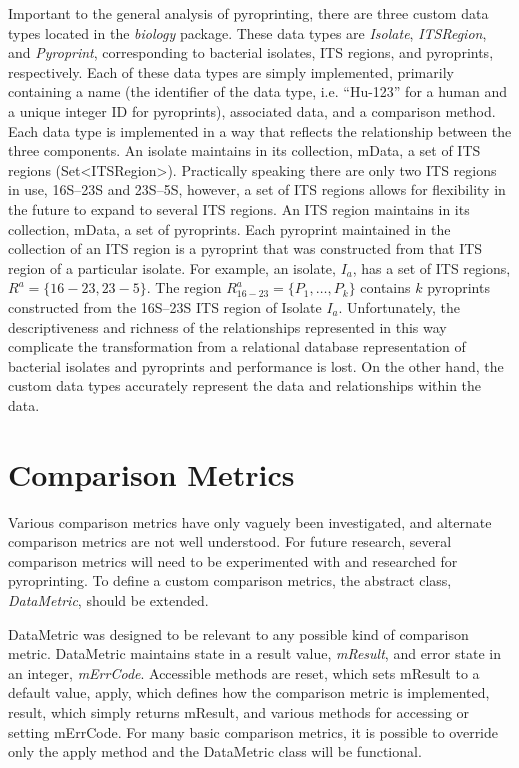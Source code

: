 \documentclass[12pt]{ucthesis}
\begin{document}
      Important to the general analysis of pyroprinting, there are three custom
      data types located in the \textit{biology} package. These data types are
      \textit{Isolate}, \textit{ITSRegion}, and \textit{Pyroprint},
      corresponding to bacterial isolates, ITS regions, and pyroprints,
      respectively. Each of these data types are simply implemented, primarily
      containing a name (the identifier of the data type, i.e. ``Hu-123'' for a
      human and a unique integer ID for pyroprints), associated data, and a
      comparison method. Each data type is implemented in a way that reflects
      the relationship between the three components. An isolate maintains in
      its collection, mData, a set of ITS regions (Set<ITSRegion>). Practically
      speaking there are only two ITS regions in use, 16S--23S and 23S--5S,
      however, a set of ITS regions allows for flexibility in the future to
      expand to several ITS regions. An ITS region maintains in its collection,
      mData, a set of pyroprints. Each pyroprint maintained in the collection
      of an ITS region is a pyroprint that was constructed from that ITS region
      of a particular isolate. For example, an isolate, $I_{a}$, has a set of ITS
      regions, $R^{a} = \{16-23, 23-5\}$. The region $R_{16-23}^{a} = \{P_1,
      \ldots, P_k\}$ contains $k$ pyroprints constructed from the 16S--23S ITS
      region of Isolate $I_{a}$. Unfortunately, the descriptiveness and
      richness of the relationships represented in this way complicate the
      transformation from a relational database representation of bacterial
      isolates and pyroprints and performance is lost. On the other hand, the
      custom data types accurately represent the data and relationships within
      the data.

   \section{Comparison Metrics}\label{sec:metrics}
      Various comparison metrics have only vaguely been investigated, and
      alternate comparison metrics are not well understood. For future
      research, several comparison metrics will need to be experimented with
      and researched for pyroprinting. To define a custom comparison metrics,
      the abstract class, \textit{DataMetric}, should be extended.

      DataMetric was designed to be relevant to any possible kind of comparison
      metric. DataMetric maintains state in a result value, \textit{mResult},
      and error state in an integer, \textit{mErrCode}. Accessible methods are
      \textsf{reset}, which sets mResult to a default value, \textsf{apply},
      which defines how the comparison metric is implemented, \textsf{result},
      which simply returns mResult, and various methods for accessing or
      setting mErrCode. For many basic comparison metrics, it is possible to
      override only the \textsf{apply} method and the DataMetric class will be
      functional.
\end{document}
